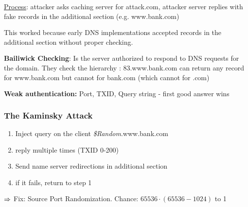 \documentclass[english, leagacyboxes, nologo]{latex4ei/latex4ei_sheet}
\begin{document}
{      \underline{Process}: attacker asks caching server for attack.com, attacker server replies with fake records in the additional section (e.g. www.bank.com)

      This worked because early DNS implementations accepted records in the additional section without proper checking.

      \textbf{Bailiwick Checking}: Is the server authorized to respond to DNS requests for the domain. They check the hierarchy : 83.www.bank.com can return any record for www.bank.com but cannot for bank.com (which cannot for .com)

      \textbf{Weak authentication:} Port, TXID, Query string - first good answer wins

    \subsubsection{The Kaminsky Attack}
      \begin{enumerate}
        \item Inject query on the client \textit{\$Random}.www.bank.com
        \item reply multiple times  (TXID 0-200)
        \item Send name server redirections in additional section
        \item if it fails, return to step 1
      \end{enumerate}
      $\Rightarrow$ Fix: Source Port Randomization. Chance: $65536 \cdot (65536 - 1024)$ to 1
  }
\end{document}
